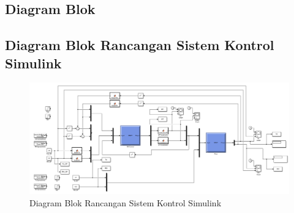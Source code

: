\begin{landscape}
	\chapter{Diagram Blok}
	\section{Diagram Blok Rancangan Sistem Kontrol Simulink}
	\begin{figure}[!h]
		\centering
		\includegraphics[width=1.5\textwidth]{figures/SimulinkBlockDiagram}
		\caption{Diagram Blok Rancangan Sistem Kontrol Simulink}
		\label{fig:C:SimulinkBlockDiagram}
	\end{figure}
\end{landscape}